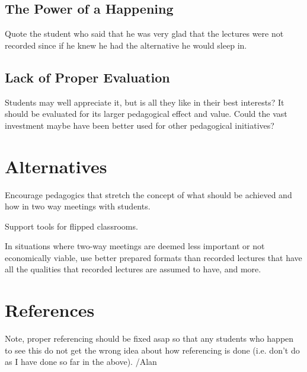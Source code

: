 \documentclass[a4paper,10pt]{article}
\begin{document}
\subsection{The Power of a Happening}
Quote the student who said that he was very glad that the lectures were not recorded since if he knew he had the alternative he would sleep in. 

\subsection{Lack of Proper Evaluation}
Students may well appreciate it, but is all they like in their best interests? It should be evaluated for its larger pedagogical effect and value.
Could the vast investment maybe have been better used for other pedagogical initiatives?

\section{Alternatives}
Encourage pedagogics that stretch the concept of what should be achieved and how in two way meetings with students.

Support tools for flipped classrooms.

In situations where two-way meetings are deemed less important or not economically viable, use better prepared formats than recorded lectures that have all the qualities that recorded lectures are assumed to have, and more.


\section{References}

Note, proper referencing should be fixed asap so that any students who happen to see this do not get the wrong idea about how referencing is done (i.e. don't do as I have done so far in the above). /Alan
\end{document}

